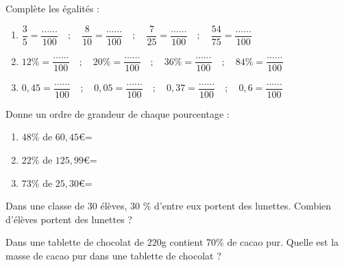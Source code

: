 \begin{pageAD} 



Complète les égalités :
\begin{enumerate}[leftmargin=*]
\item $\dfrac{3}{5} = \dfrac{\ldots\ldots}{100}  \quad;\quad \dfrac{8}{10} = \dfrac{\ldots\ldots}{100}  \quad;\quad \dfrac{7}{25} = \dfrac{\ldots\ldots}{100}  \quad;\quad \dfrac{54}{75} = \dfrac{\ldots\ldots}{100} $ \vspace{0.4cm}


\item $12 \% = \dfrac{\ldots\ldots}{100}  \quad;\quad 20 \% = \dfrac{\ldots\ldots}{100}  \quad;\quad 36 \% = \dfrac{\ldots\ldots}{100} \quad;\quad 84\% = \dfrac{\ldots\ldots}{100}$\vspace{0.4cm}
\item $0,45 = \dfrac{\ldots\ldots}{100}  \quad;\quad 0,05 = \dfrac{\ldots\ldots}{100}  \quad;\quad 0,37 = \dfrac{\ldots\ldots}{100} \quad;\quad 0,6 = \dfrac{\ldots\ldots}{100}$ 
\end{enumerate}

\vspace{0.3cm}



Donne un ordre de grandeur de chaque pourcentage :
\begin{enumerate}[leftmargin=*]
\item  $48\%$ de $60,45$\euro =  
\item  $22\%$ de $125,99$\euro  =  
\item  $73\%$ de $25,30$\euro  =  
\end{enumerate}

\vspace{0.3cm}



Dans une classe de 30 élèves, 30 \% d'entre eux portent des lunettes. Combien d'élèves portent des lunettes ?
 


Dans une tablette de chocolat de $220$g contient 70\% de cacao pur. Quelle est la masse de cacao pur dans une tablette de chocolat ?
 
 

\end{pageAD} 
 
